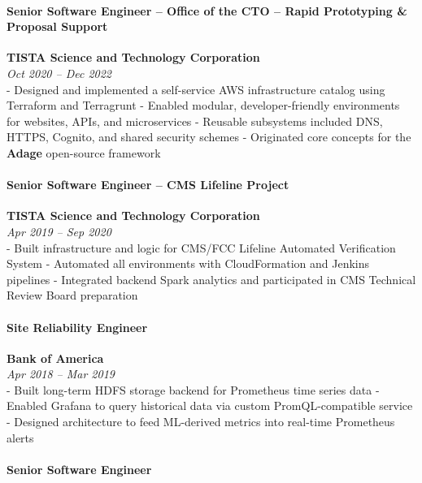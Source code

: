 \documentclass[11pt]{article}
\begin{document}
\hypertarget{senior-software-engineer-office-of-the-cto-rapid-prototyping-proposal-support}{%
\paragraph{Senior Software Engineer -- Office of the CTO -- Rapid
Prototyping \& Proposal
Support}\label{senior-software-engineer-office-of-the-cto-rapid-prototyping-proposal-support}}

\textbf{TISTA Science and Technology Corporation}\\
\emph{Oct 2020 -- Dec 2022}\\
- Designed and implemented a self-service AWS infrastructure catalog
using Terraform and Terragrunt - Enabled modular, developer-friendly
environments for websites, APIs, and microservices - Reusable subsystems
included DNS, HTTPS, Cognito, and shared security schemes - Originated
core concepts for the \textbf{Adage} open-source framework

\hypertarget{senior-software-engineer-cms-lifeline-project}{%
\paragraph{Senior Software Engineer -- CMS Lifeline
Project}\label{senior-software-engineer-cms-lifeline-project}}

\textbf{TISTA Science and Technology Corporation}\\
\emph{Apr 2019 -- Sep 2020}\\
- Built infrastructure and logic for CMS/FCC Lifeline Automated
Verification System - Automated all environments with CloudFormation and
Jenkins pipelines - Integrated backend Spark analytics and participated
in CMS Technical Review Board preparation

\hypertarget{site-reliability-engineer}{%
\paragraph{Site Reliability Engineer}\label{site-reliability-engineer}}

\textbf{Bank of America}\\
\emph{Apr 2018 -- Mar 2019}\\
- Built long-term HDFS storage backend for Prometheus time series data -
Enabled Grafana to query historical data via custom PromQL-compatible
service - Designed architecture to feed ML-derived metrics into
real-time Prometheus alerts

\hypertarget{senior-software-engineer}{%
\paragraph{Senior Software Engineer}\label{senior-software-engineer}}
\end{document}
